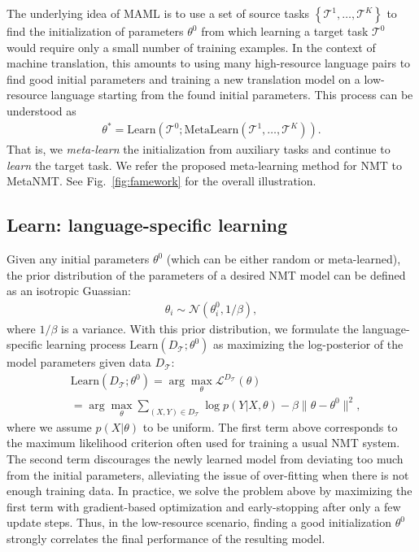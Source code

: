The underlying idea of MAML is to use a set of source tasks $\left\{ \mathcal{T}^1, \ldots, \mathcal{T}^K \right\}$ to find the initialization of parameters $\theta^0$ from which learning a target task $\mathcal{T}^0$ would require only a small number of training examples. In the context of machine translation, this amounts to using many high-resource language pairs to find good initial parameters and training a new translation model on a low-resource language starting from the found initial parameters. This process can be understood as 
\begin{align*}
\theta^* = \text{Learn}(\mathcal{T}^0; \text{MetaLearn}(\mathcal{T}^1, \ldots, \mathcal{T}^K)).
\end{align*}
That is, we {\it meta-learn} the initialization from auxiliary tasks and continue to {\it learn} the target task. We refer the proposed meta-learning method for NMT to MetaNMT.
See Fig.~\ref{fig:famework} for the overall illustration. 

\subsection{Learn: language-specific learning}
\label{sec:lsl}
Given any initial parameters $\theta^0$ (which can be either random or meta-learned), 
the prior distribution of the parameters of a desired NMT model can be defined %
as an isotropic Guassian:
\begin{align*}
    \theta_i \sim \mathcal{N}(\theta^0_i, 1/\beta),
\end{align*}
where $1/\beta$ is a variance. With this prior distribution, we formulate the language-specific learning process $\text{Learn}(D_\mathcal{T}; \theta^0)$ as maximizing the log-posterior of the model parameters given data $D_{\mathcal{T}}$:
\begin{align*}
    &\text{Learn}(D_\mathcal{T}; \theta^0) = 
    \arg\max_{\theta} \mathcal{L}^{D_\mathcal{T}} (\theta)
    \\
    &=\arg\max_{\theta}\!\!\!\!
    \sum_{(X,Y) \in D_{\mathcal{T}}} \!\! \!\!
    \log p(Y | X, \theta)  
    - \beta \| \theta - \theta^0 \|^2,
\end{align*}
where we assume $p(X|\theta)$ to be uniform. 
The first term above corresponds to the maximum likelihood criterion often used for training a usual NMT system. The second term discourages the newly learned model from deviating too much from the initial parameters, alleviating the issue of over-fitting when there is not enough training data. In practice, we solve the problem above by maximizing the first term with gradient-based optimization and early-stopping after only a few update steps. Thus, in the low-resource scenario, finding a good initialization $\theta^0$ strongly correlates the final performance of the resulting model.

